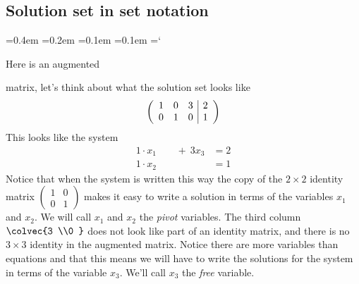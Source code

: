 
\subsection*{Solution set in set notation}
{\ttfamily
{}\font=0.4em
\font=0.2em
\font=0.1em
\font=0.1em
\hyphenchar\font=`\-


\hypertarget{solution_sets_for_systems_of_linear_equations_example}{Here is an augmented} matrix, let's think about what the solution set looks like
\[ \left( \begin{array}{ccc | c}
1 & 0 & 3 & 2 \\
0 & 1 & 0 & 1
\end{array} \right)
\]
This looks like the system
\begin{align*}
1\cdot x_1\phantom{+x_2}\ + \ 3x_3 &= 2\\
 1\cdot x_2\phantom{\ +\ 3x_3 } &= 1
\end{align*}
Notice that when the system is written this way the copy of the $2 \times 2$ identity matrix
$
\left( \begin{array}{cc}
1 & 0  \\ 0 & 1
\end{array} \right)
$
makes it easy to write a solution in terms of the variables $x_1$ and $x_2$. We will call  $x_1$ and $x_2$ the \emph{pivot} variables. The third column $\colvec{3 \\0 }$ does not look like part of an identity matrix, and there is no $3\times 3$ identity in the augmented matrix. Notice there are more variables than equations and  that this means we will have to write the solutions for the system in terms of the variable $x_3$. We'll call $x_3$ the \emph{free} variable.

}
